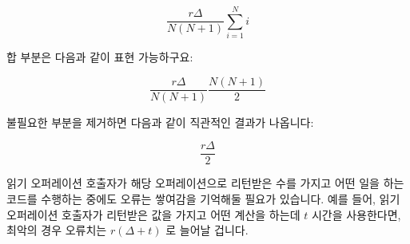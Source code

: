 \begin{lineref}
{	\begin{equation}
		\frac{r \Delta}{N \left( N + 1 \right)}
			\sum_{i = 1}^N i
	\end{equation}

	합 부분은 다음과 같이 표현 가능하구요:

	\begin{equation}
		\frac{r \Delta}{N \left( N + 1 \right)}
			\frac{N \left( N + 1 \right)}{2}
	\end{equation}

	불필요한 부분을 제거하면 다음과 같이 직관적인 결과가 나옵니다:

	\begin{equation}
		\frac{r \Delta}{2}
	\label{eq:count:CounterErrorAverage}
	\end{equation}

	읽기 오퍼레이션 호출자가 해당 오퍼레이션으로 리턴받은 수를 가지고 어떤
	일을 하는 코드를 수행하는 중에도 오류는 쌓여감을 기억해둘 필요가
	있습니다.
	예를 들어, 읽기 오퍼레이션 호출자가 리턴받은 값을 가지고 어떤 계산을
	하는데 $t$ 시간을 사용한다면, 최악의 경우 오류치는 $r \left(\Delta +
	t\right)$ 로 늘어날 겁니다.

}
\end{lineref}
